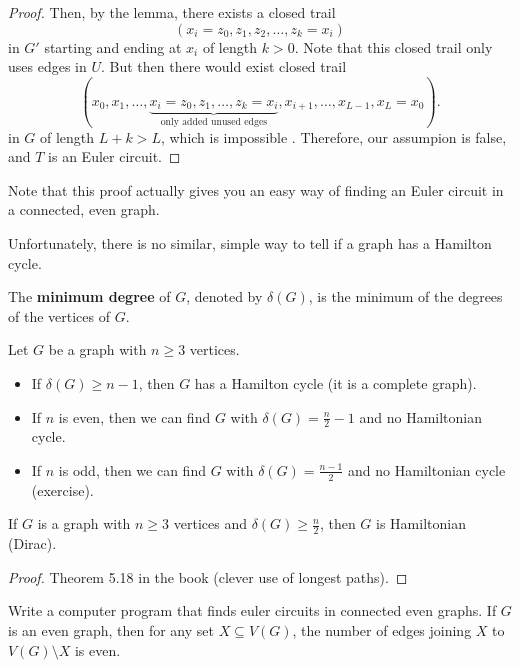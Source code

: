 \documentclass[a4paper]{article}
\begin{document}
\begin{proof}
	Then, by the lemma, there exists a closed trail \[
		(x_i=z_{0}, z_{1}, z_{2}, \ldots , z_k = x_i)
	\]  in \( G' \) starting and ending at \( x_i \) of length \( k > 0 \). Note that this closed trail only uses edges in \( U \). But then there would exist closed trail \[
	(x_{0}, x_{1}, \ldots , \underbrace{x_i = z_{0}, z_{1}, \ldots , z_k = x_i}_{\text{only added unused edges}}, x_{i+1}, \ldots , x_{L-1}, x_L = x_{0})
	.\] in \( G \) of length \( L + k > L \), which is impossible \contra. Therefore, our assumpion is false, and \( T \) is an Euler circuit.
\end{proof}

Note that this proof actually gives you an easy way of finding an Euler circuit in a connected, even graph. \par

Unfortunately, there is no similar, simple way to tell if a graph has a Hamilton cycle.

\begin{definition}
	The \textbf{minimum degree} of \( G \), denoted by \( \delta(G) \), is the minimum of the degrees of the vertices of \( G \).
\end{definition}


\begin{property}
	Let \( G \) be a graph with \( n \ge 3 \) vertices.
	\begin{itemize}
		\item If \( \delta(G) \ge n - 1 \), then \( G \) has a Hamilton cycle (it is a complete graph).
		\item If \( n \) is even, then we can find \( G \) with \( \delta(G) = \frac{n}{2} - 1 \) and no Hamiltonian cycle.
		\item If \( n \) is odd, then we can find \( G \) with \( \delta(G) = \frac{n-1}{2} \) and no Hamiltonian cycle (exercise).
	\end{itemize}
\end{property}

\begin{theorem}
	If \( G \) is a graph with \( n \ge 3 \) vertices and \( \delta(G) \ge \frac{n}{2} \), then \( G \) is Hamiltonian (Dirac).
\end{theorem}
\begin{proof}
	Theorem 5.18 in the book (clever use of longest paths).
\end{proof}

Write a computer program that finds euler circuits in connected even graphs.
If \( G \) is an even graph, then for any set \( X \subseteq V(G) \), the number of edges joining \( X \) to \( V(G)\setminus X \) is even.
\end{document}
